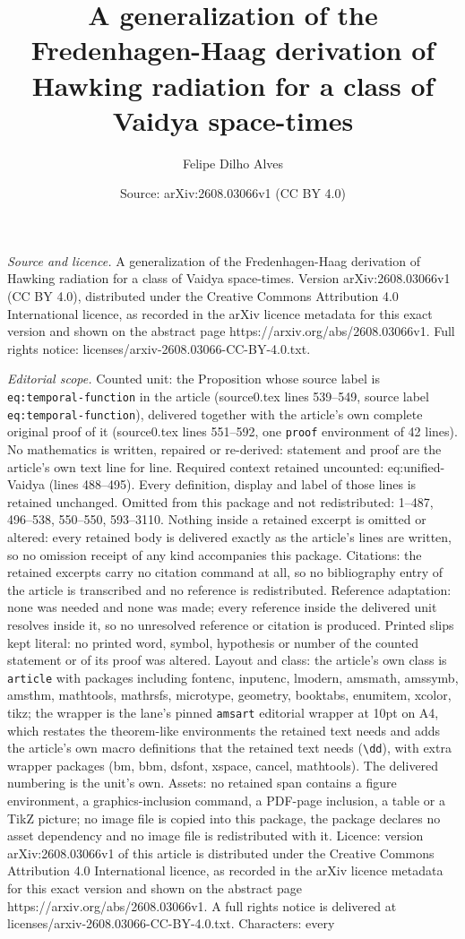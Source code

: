 \documentclass[10pt,a4paper]{amsart}
\title[A generalization of the Fredenhagen-Haag derivation of Hawki]{A generalization of the Fredenhagen-Haag derivation of Hawking radiation for a class of Vaidya space-times}
\author{Felipe Dilho Alves}
\date{Source: arXiv:2608.03066v1 (CC BY 4.0)}
\begin{document}
\maketitle

\noindent\emph{Source and licence.} A generalization of the Fredenhagen-Haag derivation of Hawking radiation for a class of Vaidya space-times. Version arXiv:2608.03066v1 (CC BY 4.0), distributed under the Creative Commons Attribution 4.0 International licence, as recorded in the arXiv licence metadata for this exact version and shown on the abstract page https://arxiv.org/abs/2608.03066v1. Full rights notice: licenses/arxiv-2608.03066-CC-BY-4.0.txt.\par\smallskip

\noindent\textit{Editorial scope.} Counted unit: the Proposition whose source label is \texttt{eq:temporal-function} in the article (source0.tex lines 539--549, source label \texttt{eq:temporal-function}), delivered together with the article's own complete original proof of it (source0.tex lines 551--592, one \texttt{proof} environment of 42 lines). No mathematics is written, repaired or re-derived: statement and proof are the article's own text line for line. Required context retained uncounted: eq:unified-Vaidya (lines 488--495). Every definition, display and label of those lines is retained unchanged. Omitted from this package and not redistributed: 1--487, 496--538, 550--550, 593--3110. Nothing inside a retained excerpt is omitted or altered: every retained body is delivered exactly as the article's lines are written, so no omission receipt of any kind accompanies this package. Citations: the retained excerpts carry no citation command at all, so no bibliography entry of the article is transcribed and no reference is redistributed. Reference adaptation: none was needed and none was made; every reference inside the delivered unit resolves inside it, so no unresolved reference or citation is produced. Printed slips kept literal: no printed word, symbol, hypothesis or number of the counted statement or of its proof was altered. Layout and class: the article's own class is \texttt{article} with packages including fontenc, inputenc, lmodern, amsmath, amssymb, amsthm, mathtools, mathrsfs, microtype, geometry, booktabs, enumitem, xcolor, tikz; the wrapper is the lane's pinned \texttt{amsart} editorial wrapper at 10pt on A4, which restates the theorem-like environments the retained text needs and adds the article's own macro definitions that the retained text needs (\texttt{\textbackslash dd}), with extra wrapper packages (bm, bbm, dsfont, xspace, cancel, mathtools). The delivered numbering is the unit's own. Assets: no retained span contains a figure environment, a graphics-inclusion command, a PDF-page inclusion, a table or a TikZ picture; no image file is copied into this package, the package declares no asset dependency and no image file is redistributed with it. Licence: version arXiv:2608.03066v1 of this article is distributed under the Creative Commons Attribution 4.0 International licence, as recorded in the arXiv licence metadata for this exact version and shown on the abstract page https://arxiv.org/abs/2608.03066v1. A full rights notice is delivered at licenses/arxiv-2608.03066-CC-BY-4.0.txt. Characters: every 
\end{document}
